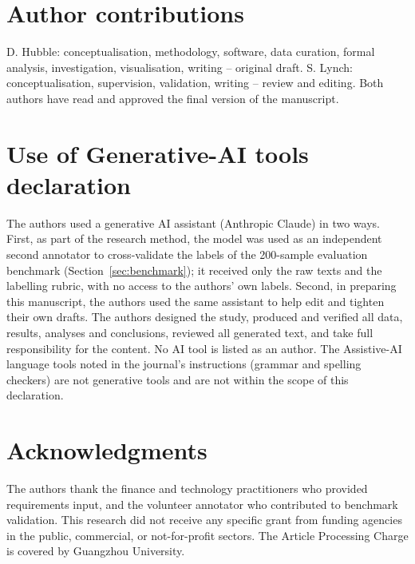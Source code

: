 \documentclass{aims}
\numberwithin{equation}{section}
\begin{document}
\section*{Author contributions}
D. Hubble: conceptualisation, methodology, software, data curation, formal analysis,
investigation, visualisation, writing -- original draft. S. Lynch: conceptualisation,
supervision, validation, writing -- review and editing. Both authors have read and
approved the final version of the manuscript.

\section*{Use of Generative-AI tools declaration}
The authors used a generative AI assistant (Anthropic Claude) in two ways. First,
as part of the research method, the model was used as an independent second
annotator to cross-validate the labels of the 200-sample evaluation benchmark
(Section~\ref{sec:benchmark}); it received only the raw texts and the labelling
rubric, with no access to the authors' own labels. Second, in preparing this
manuscript, the authors used the same assistant to help edit and tighten their own
drafts. The authors designed the study, produced and verified all data, results,
analyses and conclusions, reviewed all generated text, and take full
responsibility for the content. No AI tool is listed as an author. The Assistive-AI
language tools noted in the journal's instructions (grammar and spelling checkers)
are not generative tools and are not within the scope of this declaration.

\section*{Acknowledgments}
The authors thank the finance and technology practitioners who provided
requirements input, and the volunteer annotator who contributed to benchmark
validation. This research did not receive any specific grant
from funding agencies in the public, commercial, or not-for-profit sectors. The
Article Processing Charge is covered by Guangzhou University.
\end{document}
